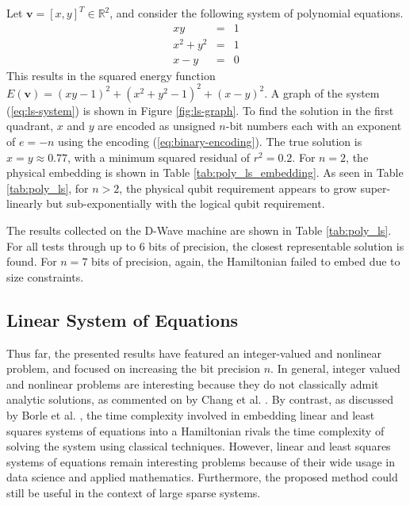 Let $\mathbf{v} = [x,y]^T \in \mathbb{R}^2$, and consider the following system of polynomial equations.
\begin{equation}
\begin{array}{rcl}
    xy &=& 1\\
    x^2+y^2 &=& 1\\
    x - y &=& 0
    \end{array}
    \label{eq:ls-system}
\end{equation}
This results in the squared energy function
$E(\mathbf{v}) = (xy-1)^2 + (x^2+y^2 - 1)^2 + (x-y)^2$.
A graph of the system (\ref{eq:ls-system}) is shown in Figure \ref{fig:ls-graph}.
To find the solution in the first quadrant, $x$ and $y$ are encoded as unsigned $n$-bit numbers each with an exponent of $e = -n$ using the encoding (\ref{eq:binary-encoding}).
The true solution is $x=y\approx 0.77$, with a minimum squared residual of $r^2 = 0.2$.
For $n=2$, the physical embedding is shown in Table \ref{tab:poly_ls_embedding}.
As seen in Table \ref{tab:poly_ls}, for $n>2$, the physical qubit requirement appears to grow super-linearly but sub-exponentially with the logical qubit requirement.



The results collected on the D-Wave machine are shown in Table \ref{tab:poly_ls}.
For all tests through up to $6$ bits of precision, the closest representable solution is found.
For $n=7$ bits of precision, again, the Hamiltonian failed to embed due to size constraints.



\subsection{Linear System of Equations}

Thus far, the presented results have featured an integer-valued and nonlinear problem, and focused on increasing the bit precision $n$.
In general, integer valued and nonlinear problems are interesting because they do not classically admit analytic solutions, as commented on by Chang et al. \cite{chang2019quantum}.
By contrast, as discussed by Borle et al. \cite{borle2019analyzing}, the time complexity involved in embedding linear and least squares systems of equations into a Hamiltonian rivals the time complexity of solving the system using classical techniques.
However, linear and least squares systems of equations remain interesting problems because of their wide usage in data science and applied mathematics.
Furthermore, the proposed method could still be useful in the context of large sparse systems.

